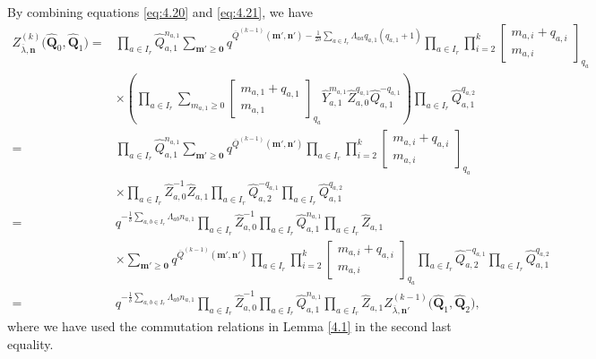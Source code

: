\documentclass[10pt,a4paper]{amsart}
\numberwithin{equation}{section}
\begin{document}
By combining equations \eqref{eq:4.20} and \eqref{eq:4.21}, we have
\begin{align}
Z_{\overline{\lambda},\mathbf{n}}^{(k)}\bigl(\widehat{\mathbf{Q}}_0,\widehat{\mathbf{Q}}_1\bigr)
={}&\prod_{a\in I_r}\widehat{Q}_{a,1}^{n_{a,1}}\sum_{\mathbf{m}'\geq\mathbf{0}}q^{\overline{Q}^{(k-1)}(\mathbf{m}',\mathbf{n}')-\frac{1}{2\delta}\sum_{a\in I_r}\Lambda_{aa}q_{a,1}(q_{a,1}+1)}\prod_{a\in I_r}\prod_{i=2}^k\begin{bmatrix}m_{a,i}+q_{a,i}\\m_{a,i}\end{bmatrix}_{q_a}\nonumber\\
& \times\left(\prod_{a\in I_r}\sum_{m_{a,1}\geq0}\begin{bmatrix}m_{a,1}+q_{a,1}\\m_{a,1}\end{bmatrix}_{q_a}\widehat{Y}_{a,1}^{m_{a,1}}\widehat{Z}_{a,0}^{q_{a,1}}\widehat{Q}_{a,1}^{-q_{a,1}}\right)\prod_{a\in I_r}\widehat{Q}_{a,1}^{q_{a,2}}\nonumber\\
={}&\prod_{a\in I_r}\widehat{Q}_{a,1}^{n_{a,1}}\sum_{\mathbf{m}'\geq\mathbf{0}}q^{\overline{Q}^{(k-1)}(\mathbf{m}',\mathbf{n}')}\prod_{a\in I_r}\prod_{i=2}^k\begin{bmatrix}m_{a,i}+q_{a,i}\\m_{a,i}\end{bmatrix}_{q_a}\nonumber\\
& \times\prod_{a\in I_r}\widehat{Z}_{a,0}^{-1}\widehat{Z}_{a,1}\prod_{a\in I_r}\widehat{Q}_{a,2}^{-q_{a,1}}\prod_{a\in I_r}\widehat{Q}_{a,1}^{q_{a,2}}\nonumber\\
={}&q^{-\frac{1}{\delta}\sum_{a,b\in I_r}\Lambda_{ab}n_{a,1}}\prod_{a\in I_r}\widehat{Z}_{a,0}^{-1}\prod_{a\in I_r}\widehat{Q}_{a,1}^{n_{a,1}}\prod_{a\in I_r}\widehat{Z}_{a,1}\nonumber\\
& \times\sum_{\mathbf{m}'\geq\mathbf{0}}q^{\overline{Q}^{(k-1)}(\mathbf{m}',\mathbf{n}')}\prod_{a\in I_r}\prod_{i=2}^k\begin{bmatrix}m_{a,i}+q_{a,i}\\m_{a,i}\end{bmatrix}_{q_a}\prod_{a\in I_r}\widehat{Q}_{a,2}^{-q_{a,1}}\prod_{a\in I_r}\widehat{Q}_{a,1}^{q_{a,2}}\nonumber\\
={}&q^{-\frac{1}{\delta}\sum_{a,b\in I_r}\Lambda_{ab}n_{a,1}}\prod_{a\in I_r}\widehat{Z}_{a,0}^{-1}\prod_{a\in I_r}\widehat{Q}_{a,1}^{n_{a,1}}\prod_{a\in I_r}\widehat{Z}_{a,1}Z_{\overline{\lambda},\mathbf{n}'}^{(k-1)}\bigl(\widehat{\mathbf{Q}}_1,\widehat{\mathbf{Q}}_2\bigr)\label{eq:4.22},
\end{align}
where we have used the commutation relations in Lemma \ref{4.1} in the second last equality.
\end{document}

